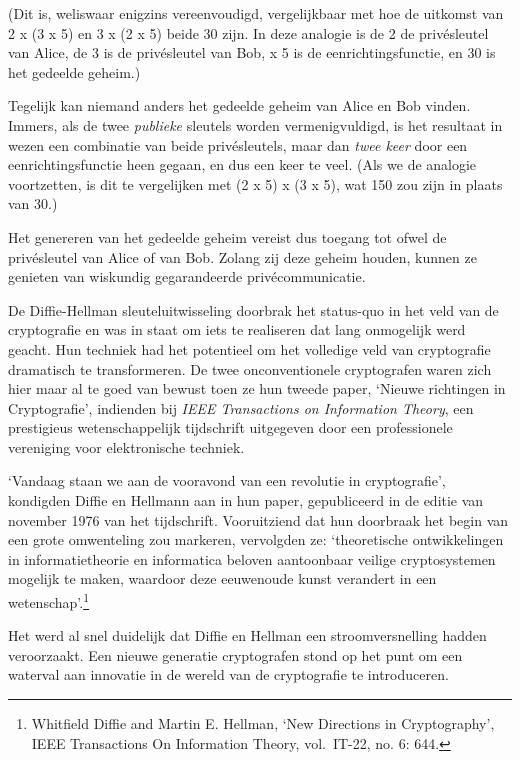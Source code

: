\documentclass[
  a5paper,
  smalldemyvopaper,11pt,twoside,onecolumn,openright,extrafontsizes]{memoir}
\begin{document}
(Dit is, weliswaar enigzins vereenvoudigd, vergelijkbaar met hoe de
uitkomst van 2 x (3 x 5) en 3 x (2 x 5) beide 30 zijn. In deze analogie
is de 2 de privésleutel van Alice, de 3 is de privésleutel van Bob, x 5
is de eenrichtingsfunctie, en 30 is het gedeelde geheim.)

Tegelijk kan niemand anders het gedeelde geheim van Alice en Bob vinden.
Immers, als de twee \emph{publieke} sleutels worden vermenigvuldigd, is
het resultaat in wezen een combinatie van beide privésleutels, maar dan
\emph{twee keer} door een eenrichtingsfunctie heen gegaan, en dus een
keer te veel. (Als we de analogie voortzetten, is dit te vergelijken met
(2 x 5) x (3 x 5), wat 150 zou zijn in plaats van 30.)

Het genereren van het gedeelde geheim vereist dus toegang tot ofwel de
privésleutel van Alice of van Bob. Zolang zij deze geheim houden, kunnen
ze genieten van wiskundig gegarandeerde privécommunicatie.

De Diffie-Hellman sleuteluitwisseling doorbrak het status-quo in het
veld van de cryptografie en was in staat om iets te realiseren dat lang
onmogelijk werd geacht. Hun techniek had het potentieel om het volledige
veld van cryptografie dramatisch te transformeren. De twee
onconventionele cryptografen waren zich hier maar al te goed van bewust
toen ze hun tweede paper, `Nieuwe richtingen in Cryptografie', indienden
bij \emph{IEEE Transactions on Information Theory}, een prestigieus
wetenschappelijk tijdschrift uitgegeven door een professionele
vereniging voor elektronische techniek.

`Vandaag staan we aan de vooravond van een revolutie in cryptografie',
kondigden Diffie en Hellmann aan in hun paper, gepubliceerd in de editie
van november 1976 van het tijdschrift. Vooruitziend dat hun doorbraak
het begin van een grote omwenteling zou markeren, vervolgden ze:
`theoretische ontwikkelingen in informatietheorie en informatica beloven
aantoonbaar veilige cryptosystemen mogelijk te maken, waardoor deze
eeuwenoude kunst verandert in een wetenschap'.\footnote{\hspace{0pt}Whitfield
  Diffie and Martin E. Hellman, `New Directions in Cryptography', IEEE
  Transactions On Information Theory, vol.~IT-22, no. 6: 644.}

Het werd al snel duidelijk dat Diffie en Hellman een stroomversnelling
hadden veroorzaakt. Een nieuwe generatie cryptografen stond op het punt
om een waterval aan innovatie in de wereld van de cryptografie te
introduceren.
\end{document}
